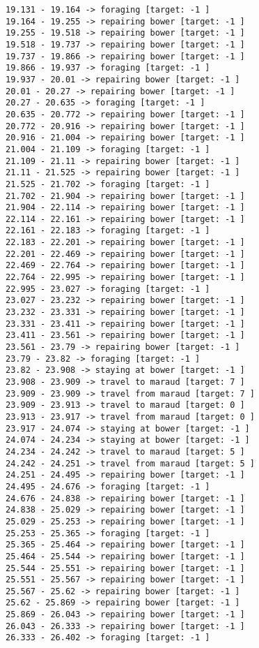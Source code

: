 \documentclass[11pt]{article}
\begin{document}
\begin{Verbatim}[commandchars=\\\{\}]
19.131 - 19.164 -> foraging [target: -1 ]
19.164 - 19.255 -> repairing bower [target: -1 ]
19.255 - 19.518 -> repairing bower [target: -1 ]
19.518 - 19.737 -> repairing bower [target: -1 ]
19.737 - 19.866 -> repairing bower [target: -1 ]
19.866 - 19.937 -> foraging [target: -1 ]
19.937 - 20.01 -> repairing bower [target: -1 ]
20.01 - 20.27 -> repairing bower [target: -1 ]
20.27 - 20.635 -> foraging [target: -1 ]
20.635 - 20.772 -> repairing bower [target: -1 ]
20.772 - 20.916 -> repairing bower [target: -1 ]
20.916 - 21.004 -> repairing bower [target: -1 ]
21.004 - 21.109 -> foraging [target: -1 ]
21.109 - 21.11 -> repairing bower [target: -1 ]
21.11 - 21.525 -> repairing bower [target: -1 ]
21.525 - 21.702 -> foraging [target: -1 ]
21.702 - 21.904 -> repairing bower [target: -1 ]
21.904 - 22.114 -> repairing bower [target: -1 ]
22.114 - 22.161 -> repairing bower [target: -1 ]
22.161 - 22.183 -> foraging [target: -1 ]
22.183 - 22.201 -> repairing bower [target: -1 ]
22.201 - 22.469 -> repairing bower [target: -1 ]
22.469 - 22.764 -> repairing bower [target: -1 ]
22.764 - 22.995 -> repairing bower [target: -1 ]
22.995 - 23.027 -> foraging [target: -1 ]
23.027 - 23.232 -> repairing bower [target: -1 ]
23.232 - 23.331 -> repairing bower [target: -1 ]
23.331 - 23.411 -> repairing bower [target: -1 ]
23.411 - 23.561 -> repairing bower [target: -1 ]
23.561 - 23.79 -> repairing bower [target: -1 ]
23.79 - 23.82 -> foraging [target: -1 ]
23.82 - 23.908 -> staying at bower [target: -1 ]
23.908 - 23.909 -> travel to maraud [target: 7 ]
23.909 - 23.909 -> travel from maraud [target: 7 ]
23.909 - 23.913 -> travel to maraud [target: 0 ]
23.913 - 23.917 -> travel from maraud [target: 0 ]
23.917 - 24.074 -> staying at bower [target: -1 ]
24.074 - 24.234 -> staying at bower [target: -1 ]
24.234 - 24.242 -> travel to maraud [target: 5 ]
24.242 - 24.251 -> travel from maraud [target: 5 ]
24.251 - 24.495 -> repairing bower [target: -1 ]
24.495 - 24.676 -> foraging [target: -1 ]
24.676 - 24.838 -> repairing bower [target: -1 ]
24.838 - 25.029 -> repairing bower [target: -1 ]
25.029 - 25.253 -> repairing bower [target: -1 ]
25.253 - 25.365 -> foraging [target: -1 ]
25.365 - 25.464 -> repairing bower [target: -1 ]
25.464 - 25.544 -> repairing bower [target: -1 ]
25.544 - 25.551 -> repairing bower [target: -1 ]
25.551 - 25.567 -> repairing bower [target: -1 ]
25.567 - 25.62 -> repairing bower [target: -1 ]
25.62 - 25.869 -> repairing bower [target: -1 ]
25.869 - 26.043 -> repairing bower [target: -1 ]
26.043 - 26.333 -> repairing bower [target: -1 ]
26.333 - 26.402 -> foraging [target: -1 ]

\end{Verbatim}
\end{document}
